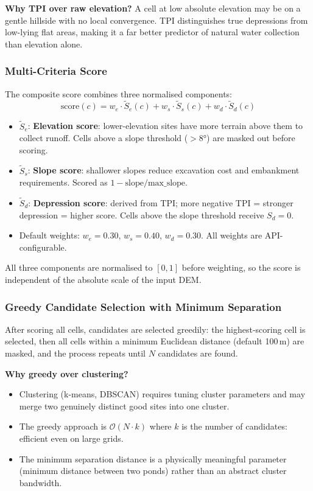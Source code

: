 \documentclass[12pt,a4paper]{article}
\begin{document}
\textbf{Why TPI over raw elevation?} A cell at low absolute elevation may be on a gentle hillside with no local convergence. TPI distinguishes true depressions from low-lying flat areas, making it a far better predictor of natural water collection than elevation alone.

\subsubsection{Multi-Criteria Score}

The composite score combines three normalised components:
\begin{equation}
    \text{score}(c) = w_e \cdot \tilde{S}_e(c) + w_s \cdot \tilde{S}_s(c) + w_d \cdot \tilde{S}_d(c)
\end{equation}

\begin{itemize}
\item $\tilde{S}_e$: \textbf{Elevation score}: lower-elevation sites have more terrain above them to collect runoff. Cells above a slope threshold ($>8°$) are masked out before scoring.
\item $\tilde{S}_s$: \textbf{Slope score}: shallower slopes reduce excavation cost and embankment requirements. Scored as $1 - \text{slope}/\text{max\_slope}$.
\item $\tilde{S}_d$: \textbf{Depression score}: derived from TPI; more negative TPI = stronger depression = higher score. Cells above the slope threshold receive $S_d = 0$.
\item Default weights: $w_e=0.30$, $w_s=0.40$, $w_d=0.30$. All weights are API-configurable.
\end{itemize}

All three components are normalised to $[0,1]$ before weighting, so the score is independent of the absolute scale of the input DEM.

\subsubsection{Greedy Candidate Selection with Minimum Separation}

After scoring all cells, candidates are selected greedily: the highest-scoring cell is selected, then all cells within a minimum Euclidean distance (default 100\,m) are masked, and the process repeats until $N$ candidates are found.

\textbf{Why greedy over clustering?}
\begin{itemize}
\item Clustering (k-means, DBSCAN) requires tuning cluster parameters and may merge two genuinely distinct good sites into one cluster.
\item The greedy approach is $\mathcal{O}(N \cdot k)$ where $k$ is the number of candidates: efficient even on large grids.
\item The minimum separation distance is a physically meaningful parameter (minimum distance between two ponds) rather than an abstract cluster bandwidth.
\end{itemize}
\end{document}
